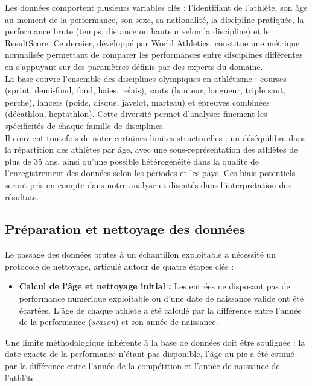 \documentclass[
  french,
  11pt,
  a4paper,
]{article}
\providecommand{\tightlist}{%
  \setlength{\itemsep}{0pt}\setlength{\parskip}{0pt}}
\begin{document}
Les données comportent plusieurs variables clés : l'identifiant de
l'athlète, son âge au moment de la performance, son sexe, sa
nationalité, la discipline pratiquée, la performance brute (temps,
distance ou hauteur selon la discipline) et le ResultScore. Ce dernier,
développé par World Athletics, constitue une métrique normalisée
permettant de comparer les performances entre disciplines différentes en
s'appuyant sur des paramètres définis par des experts du domaine.\\

La base couvre l'ensemble des disciplines olympiques en athlétisme :
courses (sprint, demi-fond, fond, haies, relais), sauts (hauteur,
longueur, triple saut, perche), lancers (poids, disque, javelot,
marteau) et épreuves combinées (décathlon, heptathlon). Cette diversité
permet d'analyser finement les spécificités de chaque famille de
disciplines.\\

Il convient toutefois de noter certaines limites structurelles : un
déséquilibre dans la répartition des athlètes par âge, avec une
sous-représentation des athlètes de plus de 35 ans, ainsi qu'une
possible hétérogénéité dans la qualité de l'enregistrement des données
selon les périodes et les pays. Ces biais potentiels seront pris en
compte dans notre analyse et discutés dans l'interprétation des
résultats.

\subsection{Préparation et nettoyage des
données}\label{pruxe9paration-et-nettoyage-des-donnuxe9es}

Le passage des données brutes à un échantillon exploitable a nécessité
un protocole de nettoyage, articulé autour de quatre étapes clés :

\begin{itemize}
\tightlist
\item
  \textbf{Calcul de l'âge et nettoyage initial :} Les entrées ne
  disposant pas de performance numérique exploitable ou d'une date de
  naissance valide ont été écartées. L'âge de chaque athlète a été
  calculé par la différence entre l'année de la performance
  (\emph{season}) et son année de naissance.
\end{itemize}

Une limite méthodologique inhérente à la base de données doit être
soulignée : la date exacte de la performance n'étant pas disponible,
l'âge au pic a été estimé par la différence entre l'année de la
compétition et l'année de naissance de l'athlète.
\end{document}
